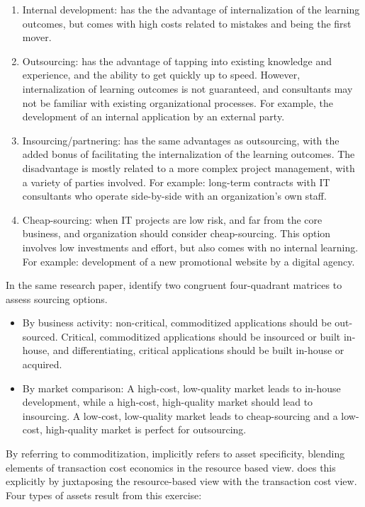 \documentclass[12pt]{article}
\providecommand{\tightlist}{%
  \setlength{\itemsep}{0pt}\setlength{\parskip}{0pt}}
\begin{document}
\begin{enumerate}
\def\labelenumi{\arabic{enumi}.}
\tightlist
\item
  Internal development: has the the advantage of internalization of the
  learning outcomes, but comes with high costs related to mistakes and
  being the first mover.
\item
  Outsourcing: has the advantage of tapping into existing knowledge and
  experience, and the ability to get quickly up to speed. However,
  internalization of learning outcomes is not guaranteed, and
  consultants may not be familiar with existing organizational
  processes. For example, the development of an internal application by
  an external party.
\item
  Insourcing/partnering: has the same advantages as outsourcing, with
  the added bonus of facilitating the internalization of the learning
  outcomes. The disadvantage is mostly related to a more complex project
  management, with a variety of parties involved. For example: long-term
  contracts with IT consultants who operate side-by-side with an
  organization's own staff.
\item
  Cheap-sourcing: when IT projects are low risk, and far from the core
  business, and organization should consider cheap-sourcing. This option
  involves low investments and effort, but also comes with no internal
  learning. For example: development of a new promotional website by a
  digital agency.
\end{enumerate}

In the same research paper, \citet[188-189]{willcocks2003} identify two
congruent four-quadrant matrices to assess sourcing options.

\begin{itemize}
\tightlist
\item
  By business activity: non-critical, commoditized applications should
  be out-sourced. Critical, commoditized applications should be
  insourced or built in-house, and differentiating, critical
  applications should be built in-house or acquired.
\item
  By market comparison: A high-cost, low-quality market leads to
  in-house development, while a high-cost, high-quality market should
  lead to insourcing. A low-cost, low-quality market leads to
  cheap-sourcing and a low-cost, high-quality market is perfect for
  outsourcing.
\end{itemize}

By referring to commoditization, \citet{willcocks2003} implicitly refers
to asset specificity, blending elements of transaction cost economics in
the resource based view. \citet{watjatrakul2005} does this explicitly by
juxtaposing the resource-based view with the transaction cost view. Four
types of assets result from this exercise:
\end{document}
